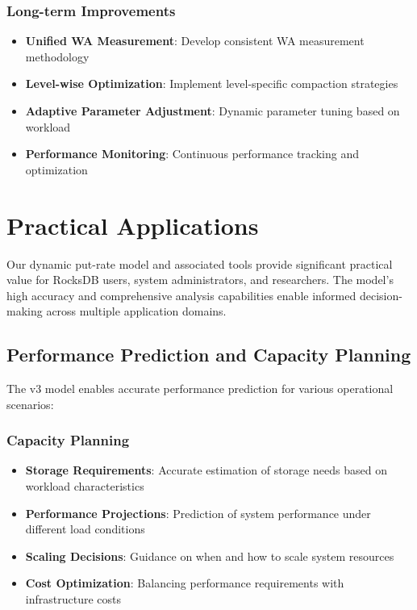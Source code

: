 \documentclass[11pt]{article}
\begin{document}
\subsubsection{Long-term Improvements}
\begin{itemize}
    \item \textbf{Unified WA Measurement}: Develop consistent WA measurement methodology
    \item \textbf{Level-wise Optimization}: Implement level-specific compaction strategies
    \item \textbf{Adaptive Parameter Adjustment}: Dynamic parameter tuning based on workload
    \item \textbf{Performance Monitoring}: Continuous performance tracking and optimization
\end{itemize}

\section{Practical Applications}

Our dynamic put-rate model and associated tools provide significant practical value for RocksDB users, system administrators, and researchers. The model's high accuracy and comprehensive analysis capabilities enable informed decision-making across multiple application domains.

\subsection{Performance Prediction and Capacity Planning}

The v3 model enables accurate performance prediction for various operational scenarios:

\subsubsection{Capacity Planning}
\begin{itemize}
    \item \textbf{Storage Requirements}: Accurate estimation of storage needs based on workload characteristics
    \item \textbf{Performance Projections}: Prediction of system performance under different load conditions
    \item \textbf{Scaling Decisions}: Guidance on when and how to scale system resources
    \item \textbf{Cost Optimization}: Balancing performance requirements with infrastructure costs
\end{itemize}
\end{document}
